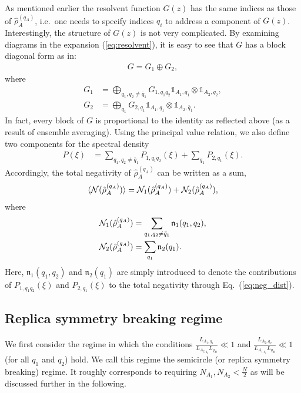 \documentclass[aps,pra,reprint,superscriptaddress,twocolumn,notitlepage]{revtex4-1}
\numberwithin{equation}{section}
\begin{document}
As mentioned earlier the resolvent function $G(z)$ has the same indices as those of $\hat \rho_{A}^{(q_A)}$, i.e.~one needs to specify indices $q_i$ to address a component of $G(z)$. Interestingly, the structure of $G(z)$ is not very complicated. By examining diagrams in the expansion (\ref{eq:resolvent}), it is easy to see that $G$ has a block diagonal form as 
in:
\begin{align}
    G = G_1 \oplus G_2,
\end{align}
where
\begin{equation}
\label{eq:structure_of_G}
\begin{aligned}
    G_1 &=  \bigoplus_{q_1,q_2\neq \bar{q}_1}  G_{1,q_1q_2}  \mathbb{1}_{A_1,q_1} \otimes \mathbb{1}_{A_2,q_2}, \\
    G_2 &= \bigoplus_{q_1}  G_{2,q_1} \mathbb{1}_{A_1,q_1} \otimes \mathbb{1}_{A_2,\bar{q}_1}.
\end{aligned}
\end{equation}
In fact, every block of $G$ is proportional to the identity as reflected above (as a result of ensemble averaging). Using the principal value relation, we also define two components for the spectral density
\begin{align}
    \label{eq:spec-decomposition}        
    P(\xi) &= \sum_{q_1,q_2 \neq \bar{q}_1} P_{1,q_1 q_2}(\xi) + \sum_{q_1} P_{2,q_1}(\xi).
\end{align}
Accordingly, the total negativity of $\hat\rho_A^{(q_A)}$ can be written as a sum,
\begin{align}
    \label{eq:neg-qA-contributions}
    \braket{{\cal N}(\hat\rho_A^{(q_A)})} =
    {\cal N}_1(\hat\rho_A^{(q_A)})+
        {\cal N}_2(\hat\rho_A^{(q_A)}), 
\end{align}
where 
\begin{align}
    {\cal N}_1(\hat\rho_A^{(q_A)}) &=
    \sum_{q_1,q_2\neq \bar q_1} \mathfrak{n}_{1}(q_1,q_2), \\
    {\cal N}_2(\hat\rho_A^{(q_A)}) &=
        \sum_{q_1} \mathfrak{n}_{2}(q_1).
\end{align}
Here, $\mathfrak{n}_{1}(q_1,q_2)$ and $\mathfrak{n}_{2}(q_1)$ are simply introduced to denote the contributions of $ P_{1,q_1 q_2}(\xi)$ and $P_{2,q_1}(\xi)$ to the total negativity through Eq.~(\ref{eq:neg_dist}).



\subsection{Replica symmetry breaking regime }
We first consider the regime in which the conditions $\frac{ L_{A_1,q_1} }{ L_{A_{2,q_2 } } L_{q_B}  } \ll 1 $ and $\frac{ L_{A_2,q_2} }{ L_{A_{1,q_{1} } } L_{q_B}  } \ll 1 $ (for all $q_1$ and $q_2$) hold. We call this regime the semicircle (or replica symmetry breaking) regime. It roughly corresponds to requiring $N_{A_1},N_{A_2}<\frac{N}{2}$ as will be discussed further in the following. 
\end{document}
